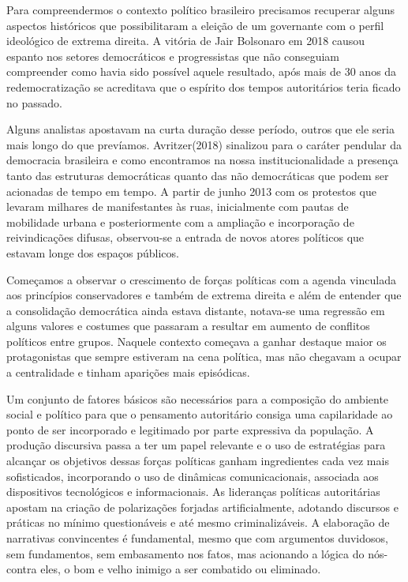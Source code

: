 Para compreendermos o contexto político brasileiro precisamos recuperar
alguns aspectos históricos que possibilitaram a eleição de um governante
com o perfil ideológico de extrema direita. A vitória de Jair Bolsonaro
em 2018 causou espanto nos setores democráticos e progressistas que não
conseguiam compreender como havia sido possível aquele resultado, após
mais de 30 anos da redemocratização se acreditava que o espírito dos
tempos autoritários teria ficado no passado.

Alguns analistas apostavam na curta duração desse período, outros que
ele seria mais longo do que prevíamos. Avritzer(2018) sinalizou para o
caráter pendular da democracia brasileira e como encontramos na nossa
institucionalidade a presença tanto das estruturas democráticas quanto
das não democráticas que podem ser acionadas de tempo em tempo. A partir
de junho 2013 com os protestos que levaram milhares de manifestantes às
ruas, inicialmente com pautas de mobilidade urbana e posteriormente com
a ampliação e incorporação de reivindicações difusas, observou-se a
entrada de novos atores políticos que estavam longe dos espaços
públicos.

Começamos a observar o crescimento de forças políticas com a agenda
vinculada aos princípios conservadores e também de extrema direita e
além de entender que a consolidação democrática ainda estava distante,
notava-se uma regressão em alguns valores e costumes que passaram a
resultar em aumento de conflitos políticos entre grupos. Naquele
contexto começava a ganhar destaque maior os protagonistas que sempre
estiveram na cena política, mas não chegavam a ocupar a centralidade e
tinham aparições mais episódicas.

Um conjunto de fatores básicos são necessários para a composição do
ambiente social e político para que o pensamento autoritário consiga uma
capilaridade ao ponto de ser incorporado e legitimado por parte
expressiva da população. A produção discursiva passa a ter um papel
relevante e o uso de estratégias para alcançar os objetivos dessas
forças políticas ganham ingredientes cada vez mais sofisticados,
incorporando o uso de dinâmicas comunicacionais, associada aos
dispositivos tecnológicos e informacionais. As lideranças políticas
autoritárias apostam na criação de polarizações forjadas
artificialmente, adotando discursos e práticas no mínimo questionáveis e
até mesmo criminalizáveis. A elaboração de narrativas convincentes é
fundamental, mesmo que com argumentos duvidosos, sem fundamentos, sem
embasamento nos fatos, mas acionando a lógica do nós-contra eles, o bom
e velho inimigo a ser combatido ou eliminado.


